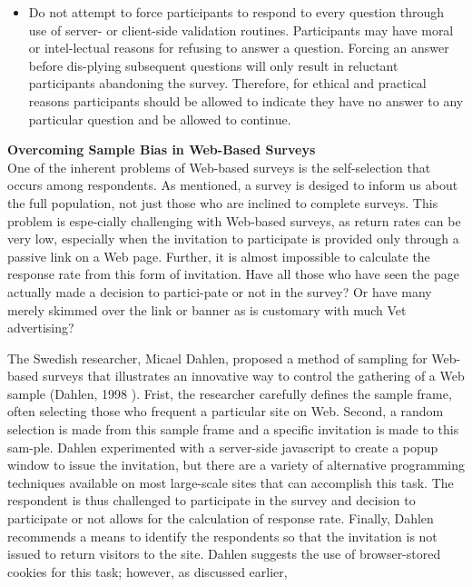 \documentclass[8pt]{beamer}
\begin{document}
\begin{frame}
\begin{itemize}
  \item Do not attempt to force participants to respond to every question through use of server- or client-side validation routines. Participants may have moral or intel-lectual reasons for refusing to answer a question. Forcing an answer before dis-plying    subsequent   questions  will  only  result  in  reluctant  participants abandoning the survey. Therefore, for ethical and practical reasons participants should be allowed to indicate they have no answer to any particular question and be allowed to continue.\\
\end{itemize}

\vspace*{0.5cm}
\large{
\textbf{Overcoming Sample Bias in Web-Based Surveys}\\
}
\vspace*{0.1cm}
\small{
One of the inherent problems of Web-based surveys is the self-selection that occurs among respondents. As mentioned, a survey is desiged to inform us about the full population, not just those who are inclined to complete surveys. This problem is espe-cially challenging with Web-based surveys, as return rates can be very low, especially when the invitation to participate is provided only through a passive link on a Web page.
Further, it is almost impossible to calculate the response rate from this form of invitation. Have all those who have seen the page actually made a decision to partici-pate or not in the survey? Or have many merely skimmed over the link or banner as is customary with much Vet advertising?\\
}
\end{frame}

\begin{frame}
The Swedish researcher, Micael Dahlen, proposed a method of sampling for Web-based surveys that illustrates an innovative way to control the gathering of a Web sample (Dahlen, 1998 ). Frist, the researcher carefully defines the sample frame, often selecting those who frequent a particular site on Web. Second, a random selection is made from this sample frame and a specific invitation is made to this sam-ple. Dahlen experimented with a server-side javascript to create a popup window to issue the invitation, but there are a variety of alternative programming techniques available on most large-scale sites that can accomplish this task. The respondent is thus challenged to participate in the survey and decision to participate or not allows for the calculation of response rate. Finally, Dahlen recommends a means to identify the respondents so that the invitation is not issued to return visitors to the site. Dahlen suggests the use of browser-stored cookies for this task; however, as discussed earlier,\\
\end{frame}
\end{document}
